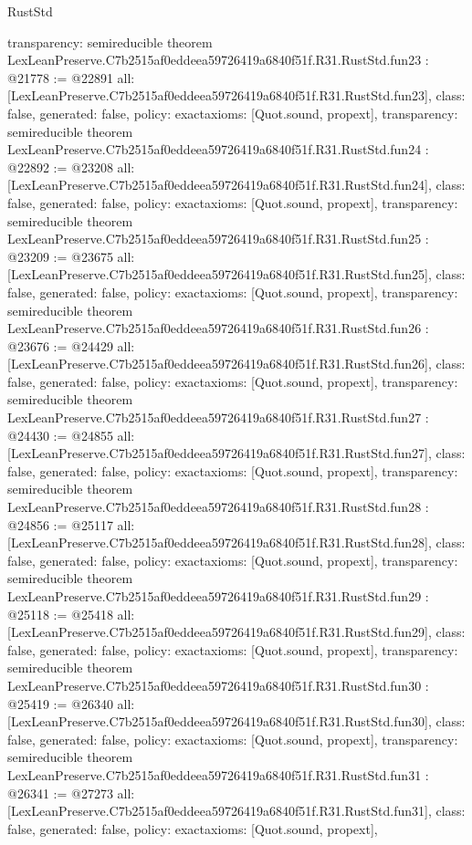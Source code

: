 \begin{lexlean}{RustStd}
\begin{coremodule}
{  transparency: semireducible
}
theorem LexLeanPreserve.C7b2515af0eddeea59726419a6840f51f.R31.RustStd.fun23 : @21778 := @22891 {
  all: [LexLeanPreserve.C7b2515af0eddeea59726419a6840f51f.R31.RustStd.fun23],
  class: false,
  generated: false,
  policy: exact{axioms: [Quot.sound, propext]},
  transparency: semireducible
}
theorem LexLeanPreserve.C7b2515af0eddeea59726419a6840f51f.R31.RustStd.fun24 : @22892 := @23208 {
  all: [LexLeanPreserve.C7b2515af0eddeea59726419a6840f51f.R31.RustStd.fun24],
  class: false,
  generated: false,
  policy: exact{axioms: [Quot.sound, propext]},
  transparency: semireducible
}
theorem LexLeanPreserve.C7b2515af0eddeea59726419a6840f51f.R31.RustStd.fun25 : @23209 := @23675 {
  all: [LexLeanPreserve.C7b2515af0eddeea59726419a6840f51f.R31.RustStd.fun25],
  class: false,
  generated: false,
  policy: exact{axioms: [Quot.sound, propext]},
  transparency: semireducible
}
theorem LexLeanPreserve.C7b2515af0eddeea59726419a6840f51f.R31.RustStd.fun26 : @23676 := @24429 {
  all: [LexLeanPreserve.C7b2515af0eddeea59726419a6840f51f.R31.RustStd.fun26],
  class: false,
  generated: false,
  policy: exact{axioms: [Quot.sound, propext]},
  transparency: semireducible
}
theorem LexLeanPreserve.C7b2515af0eddeea59726419a6840f51f.R31.RustStd.fun27 : @24430 := @24855 {
  all: [LexLeanPreserve.C7b2515af0eddeea59726419a6840f51f.R31.RustStd.fun27],
  class: false,
  generated: false,
  policy: exact{axioms: [Quot.sound, propext]},
  transparency: semireducible
}
theorem LexLeanPreserve.C7b2515af0eddeea59726419a6840f51f.R31.RustStd.fun28 : @24856 := @25117 {
  all: [LexLeanPreserve.C7b2515af0eddeea59726419a6840f51f.R31.RustStd.fun28],
  class: false,
  generated: false,
  policy: exact{axioms: [Quot.sound, propext]},
  transparency: semireducible
}
theorem LexLeanPreserve.C7b2515af0eddeea59726419a6840f51f.R31.RustStd.fun29 : @25118 := @25418 {
  all: [LexLeanPreserve.C7b2515af0eddeea59726419a6840f51f.R31.RustStd.fun29],
  class: false,
  generated: false,
  policy: exact{axioms: [Quot.sound, propext]},
  transparency: semireducible
}
theorem LexLeanPreserve.C7b2515af0eddeea59726419a6840f51f.R31.RustStd.fun30 : @25419 := @26340 {
  all: [LexLeanPreserve.C7b2515af0eddeea59726419a6840f51f.R31.RustStd.fun30],
  class: false,
  generated: false,
  policy: exact{axioms: [Quot.sound, propext]},
  transparency: semireducible
}
theorem LexLeanPreserve.C7b2515af0eddeea59726419a6840f51f.R31.RustStd.fun31 : @26341 := @27273 {
  all: [LexLeanPreserve.C7b2515af0eddeea59726419a6840f51f.R31.RustStd.fun31],
  class: false,
  generated: false,
  policy: exact{axioms: [Quot.sound, propext]},
}
\end{coremodule}
\end{lexlean}
